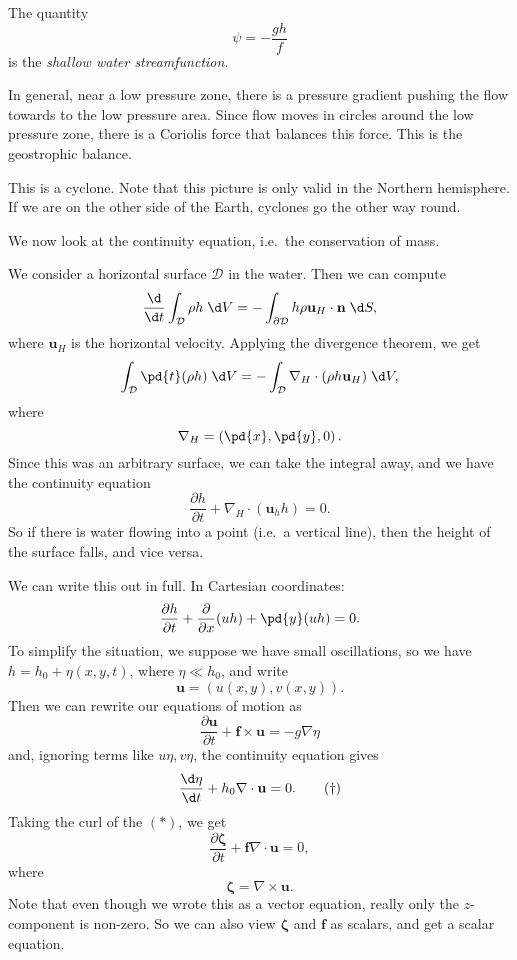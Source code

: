 \documentclass[a4paper]{article}
\begin{document}
\begin{defi}
  The quantity
  \[
    \psi = -\frac{gh}{f}
  \]
  is the \emph{shallow water streamfunction}.
\end{defi}

In general, near a low pressure zone, there is a pressure gradient pushing the flow towards to the low pressure area. Since flow moves in circles around the low pressure zone, there is a Coriolis force that balances this force. This is the geostrophic balance.
\begin{center}
\end{center}
This is a cyclone. Note that this picture is only valid in the Northern hemisphere. If we are on the other side of the Earth, cyclones go the other way round.

We now look at the continuity equation, i.e.\ the conservation of mass.

We consider a horizontal surface $\mathcal{D}$ in the water. Then we can compute
\[
  \frac{\d}{\d t} \int_\mathcal{D} \rho h \;\d V = -\int_{\partial \mathcal{D}} h \rho \mathbf{u}_H \cdot \mathbf{n}\;\d S,
\]
where $\mathbf{u}_H$ is the horizontal velocity. Applying the divergence theorem, we get
\[
  \int_{\mathcal{D}} \pd{t} (\rho h)\;\d V = -\int_{\mathcal{D}} \nabla_H \cdot (\rho h \mathbf{u}_H)\;\d V,
\]
where
\[
  \nabla_H = \left(\pd{x}, \pd{y}, 0\right).
\]
Since this was an arbitrary surface, we can take the integral away, and we have the continuity equation
\[
  \frac{\partial h}{\partial t} + \nabla_H \cdot (\mathbf{u}_h h) = 0.
\]
So if there is water flowing into a point (i.e.\ a vertical line), then the height of the surface falls, and vice versa.

We can write this out in full. In Cartesian coordinates:
\[
  \frac{\partial h}{\partial t} + \frac{\partial}{\partial x}(uh) + \pd{y}(uh) = 0.
\]
To simplify the situation, we suppose we have small oscillations, so we have $h = h_0 + \eta(x, y, t)$, where $\eta \ll h_0$, and write
\[
  \mathbf{u} = (u(x, y), v(x, y)).
\]
Then we can rewrite our equations of motion as
\[
  \frac{\partial \mathbf{u}}{\partial t} + \mathbf{f} \times \mathbf{u} = -g \nabla \eta\tag{$*$}
\]
and, ignoring terms like $u\eta, v\eta$, the continuity equation gives
\[
  \frac{\d \eta}{\d t} + h_0 \nabla \cdot \mathbf{u} = 0.\tag{$\dagger$}
\]
Taking the curl of the $(*)$, we get
\[
  \frac{\partial \boldsymbol\zeta}{\partial t} + \mathbf{f}\nabla \cdot \mathbf{u} = 0,
\]
where
\[
  \boldsymbol\zeta = \nabla \times \mathbf{u}.
\]
Note that even though we wrote this as a vector equation, really only the $z$-component is non-zero. So we can also view $\boldsymbol\zeta$ and $\mathbf{f}$ as scalars, and get a scalar equation.
\end{document}
